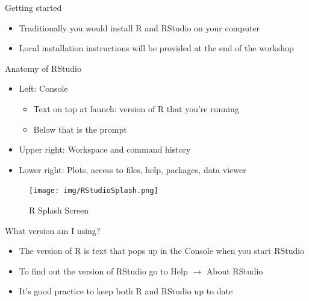 \documentclass[
  ignorenonframetext,
]{beamer}
\providecommand{\tightlist}{%
  \setlength{\itemsep}{0pt}\setlength{\parskip}{0pt}}
\begin{document}
\begin{frame}{Getting started}
\protect\hypertarget{getting-started}{}
\begin{itemize}
\item
  Traditionally you would install R and RStudio on your computer
\item
  Local installation instructions will be provided at the end of the
  workshop
\end{itemize}
\end{frame}

\begin{frame}{Anatomy of RStudio}
\protect\hypertarget{anatomy-of-rstudio}{}
\begin{itemize}
\tightlist
\item
  Left: Console

  \begin{itemize}
  \tightlist
  \item
    Text on top at launch: version of R that you're running
  \item
    Below that is the prompt
  \end{itemize}
\item
  Upper right: Workspace and command history
\item
  Lower right: Plots, access to files, help, packages, data viewer
\end{itemize}

\begin{figure}
\centering
\texttt{[image: img/RStudioSplash.png]}
\caption{R Splash Screen}
\end{figure}
\end{frame}

\begin{frame}{What version am I using?}
\protect\hypertarget{what-version-am-i-using}{}
\begin{itemize}
\item
  The version of R is text that pops up in the Console when you start
  RStudio
\item
  To find out the version of RStudio go to Help \(\rightarrow\) About
  RStudio
\item
  It's good practice to keep both R and RStudio up to date
\end{itemize}
\end{frame}
\end{document}
